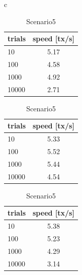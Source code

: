 \documentclass[a4paper, oneside]{discothesis}
\begin{document}
\begin{table}[t]
    \begin{center}
        \begin{tabular}{c}

            \begin{minipage}{0.33\hsize}
                \begin{center}
                    \caption{Scenario3}
                    \label{tbl:scenario3}
                    \begin{tabular}{|l|c|} \hline
                        trials & speed [tx/s]\\ \hline \hline
                        10 & 5.17 \\
                        100 & 4.58 \\
                        1000 & 4.92 \\
                        10000 & 2.71 \\ \hline
                    \end{tabular}
                \end{center}
            \end{minipage}

            \begin{minipage}{0.33\hsize}
                \begin{center}
                    \caption{Scenario4}
                    \label{tbl:scenario4}
                    \begin{tabular}{|l|c|} \hline
                        trials & speed [tx/s]\\ \hline \hline
                        10 & 5.33 \\
                        100 & 5.52 \\
                        1000 & 5.44 \\
                        10000 & 4.54 \\ \hline
                    \end{tabular}
                \end{center}
            \end{minipage}

            \begin{minipage}{0.33\hsize}
                \begin{center}
                    \caption{Scenario5}
                    \label{tbl:scenario5}
                    \begin{tabular}{|l|c|} \hline
                        trials & speed [tx/s]\\ \hline \hline
                        10 &  5.38 \\
                        100 & 5.23 \\
                        1000 & 4.29 \\
                        10000 & 3.14 \\ \hline
                    \end{tabular}
                \end{center}
            \end{minipage}


\end{tabular}
\end{center}
\end{table}
\end{document}
